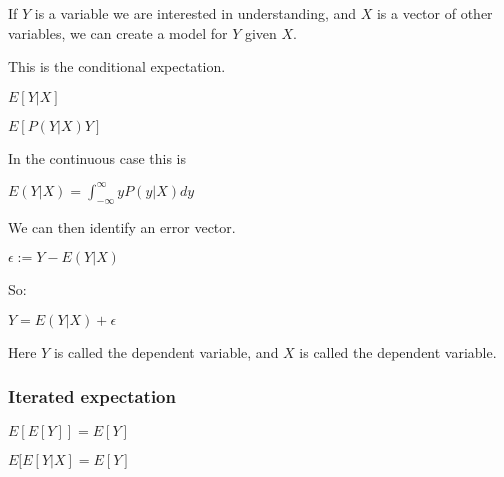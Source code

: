 If \(Y\) is a variable we are interested in understanding, and \(X\) is a vector of other variables, we can create a model for \(Y\) given \(X\).

This is the conditional expectation.

\(E[Y|X]\)

\(E[P(Y|X)Y]\)

In the continuous case this is

\(E(Y|X)=\int_{-\infty }^{\infty }yP(y|X)dy\)

We can then identify an error vector.

\(\epsilon :=Y-E(Y|X)\)

So:

\(Y=E(Y|X)+\epsilon \)

Here \(Y\) is called the dependent variable, and \(X\) is called the dependent variable.

\subsubsection{Iterated expectation}

\(E[E[Y]]=E[Y]\)

\(E[E[Y|X]=E[Y]\)

